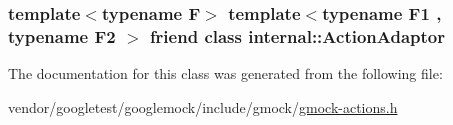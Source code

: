 \subsubsection[{\texorpdfstring{internal\+::\+Action\+Adaptor}{internal::ActionAdaptor}}]{\setlength{\rightskip}{0pt plus 5cm}template$<$typename F$>$ template$<$typename F1 , typename F2 $>$ friend class {\bf internal\+::\+Action\+Adaptor}\hspace{0.3cm}{\ttfamily [friend]}}\hypertarget{classtesting_1_1Action_a66fe4f9c9b9d020273151aa6054b491e}{}\label{classtesting_1_1Action_a66fe4f9c9b9d020273151aa6054b491e}


The documentation for this class was generated from the following file\+:\begin{DoxyCompactItemize}
\item 
vendor/googletest/googlemock/include/gmock/\hyperlink{gmock-actions_8h}{gmock-\/actions.\+h}\end{DoxyCompactItemize}
